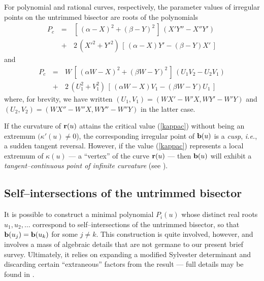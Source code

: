 For polynomial and rational curves, respectively, the parameter
values of irregular points on the untrimmed bisector are roots of
the polynomials
\begin{eqnarray} \label{Pcusp}
P_c &\,=\,& [\,(\alpha-X)^2+(\beta-Y)^2\,]\,(X'Y''-X''Y') \nonumber \\
    &\,+\,& 2\,({X'}^2+{Y'}^2)\,[\,(\alpha-X)Y'-(\beta-Y)X'\,]
\end{eqnarray}
and
\begin{eqnarray} \label{Rcusp}
P_c &\,=\,& W\,[\,(\alpha W-X)^2+(\beta W-Y)^2\,]\,(U_1V_2-U_2V_1)
\nonumber \\
    &\,+\,& 2\,(U_1^2+V_1^2)\,[\,(\alpha W-X)V_1-(\beta W-Y)U_1\,]
\end{eqnarray}
where, for brevity, we have written $(U_1,V_1)=(WX'-W'X,WY'-W'Y)$
and $(U_2,V_2)=(WX''-W''X,WY''-W''Y)$ in the latter case.

\begin{rmk} {\rm
If the curvature of ${\bf r}(u)$ attains the critical value
(\ref{kappac}) without being an extremum $(\kappa'(u)\not=0$),
the corresponding irregular point of ${\bf b}(u)$ is a {\it cusp},
{\it i.e.}, a sudden tangent reversal. However, if the value
(\ref{kappac}) represents a local extremum of $\kappa(u)$ --- a
``vertex'' of the curve ${\bf r}(u)$ --- then ${\bf b}(u)$ will
exhibit a {\it tangent--continuous point of infinite curvature}
(see \cite{farouki91b}). }
\end{rmk}

\subsection{Self--intersections of the untrimmed bisector}

It is possible to construct a minimal polynomial $P_i(u)$
whose distinct real roots $u_1,u_2,\ldots$ correspond to
self--intersections of the untrimmed bisector, so that ${\bf b}
(u_j)={\bf b}(u_k)$ for some $j\not=k$. This construction is quite
involved, however, and involves a mass of algebraic details that
are not germane to our present brief survey. Ultimately, it relies
on expanding a modified Sylvester determinant and discarding certain
``extraneous'' factors from the result --- full details may be
found in \cite{farouki91b}.


